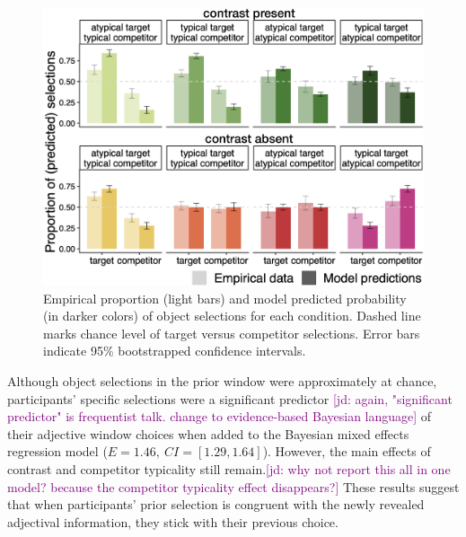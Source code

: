 \documentclass[10pt,letterpaper]{article}
\newcommand{\jd}[1]{\textcolor{Purple}{[jd: #1]}}
\begin{document}


\begin{figure}
	\begin{center}
		\includegraphics[width=.475\textwidth]{graphs/model-bycond-paper.pdf}
	\end{center}
\caption{Empirical proportion (light bars) and model predicted probability (in darker colors) of object selections for each condition. Dashed line marks chance level of target versus competitor selections. Error bars indicate 95\% bootstrapped confidence intervals.} %
\label{modelcompr-results}
\end{figure}

Although object selections in the prior window were approximately at chance, participants' specific selections were a significant predictor \jd{again, "significant predictor" is frequentist talk. change to evidence-based Bayesian language} of their adjective window choices when added to the Bayesian mixed effects regression model ($E=1.46,\ CI=[1.29,1.64]$). However, the main effects of contrast and competitor typicality still remain.\jd{why not report this all in one model? because the competitor typicality effect disappears?} These results suggest that when participants' prior selection is congruent with the newly revealed adjectival information, they stick with their previous choice. 
\end{document}
